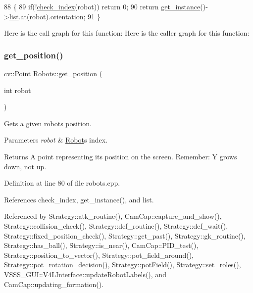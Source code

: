 \begin{DoxyCode}
88                                         \{
89     \textcolor{keywordflow}{if}(!\hyperlink{robots_8hpp_ae3e6ae8f87cdc750c0b99bc609d9ae43}{check\_index}(robot)) \textcolor{keywordflow}{return} 0;
90     \textcolor{keywordflow}{return} \hyperlink{class_robots_a589bce74db5f34af384952d48435168f}{get\_instance}()->\hyperlink{class_robots_a2c6b77265028f82a4342ca1ef15ed305}{list}.at(robot).orientation;
91 \}
\end{DoxyCode}
Here is the call graph for this function\+:
Here is the caller graph for this function\+:
\mbox{\label{class_robots_a1fca8f2f5070176faa6ba1efa2f1ff14}} 
\subsubsection{\texorpdfstring{get\+\_\+position()}{get\_position()}}
{\footnotesize\ttfamily cv\+::\+Point Robots\+::get\+\_\+position (\begin{DoxyParamCaption}\item[{int}]{robot }\end{DoxyParamCaption})\hspace{0.3cm}{\ttfamily [static]}}

Gets a given robot\textquotesingle{}s position. 
\begin{DoxyParams}{Parameters}
{\em robot} & \hyperlink{struct_robots_1_1_robot}{Robot}\textquotesingle{}s index. \\
\hline
\end{DoxyParams}
\begin{DoxyReturn}{Returns}
A point representing its position on the screen. Remember\+: Y grows down, not up. 
\end{DoxyReturn}


Definition at line 80 of file robots.\+cpp.



References check\+\_\+index, get\+\_\+instance(), and list.



Referenced by Strategy\+::atk\+\_\+routine(), Cam\+Cap\+::capture\+\_\+and\+\_\+show(), Strategy\+::collision\+\_\+check(), Strategy\+::def\+\_\+routine(), Strategy\+::def\+\_\+wait(), Strategy\+::fixed\+\_\+position\+\_\+check(), Strategy\+::get\+\_\+past(), Strategy\+::gk\+\_\+routine(), Strategy\+::has\+\_\+ball(), Strategy\+::is\+\_\+near(), Cam\+Cap\+::\+P\+I\+D\+\_\+test(), Strategy\+::position\+\_\+to\+\_\+vector(), Strategy\+::pot\+\_\+field\+\_\+around(), Strategy\+::pot\+\_\+rotation\+\_\+decision(), Strategy\+::pot\+Field(), Strategy\+::set\+\_\+roles(), V\+S\+S\+S\+\_\+\+G\+U\+I\+::\+V4\+L\+Interface\+::update\+Robot\+Labels(), and Cam\+Cap\+::updating\+\_\+formation().


